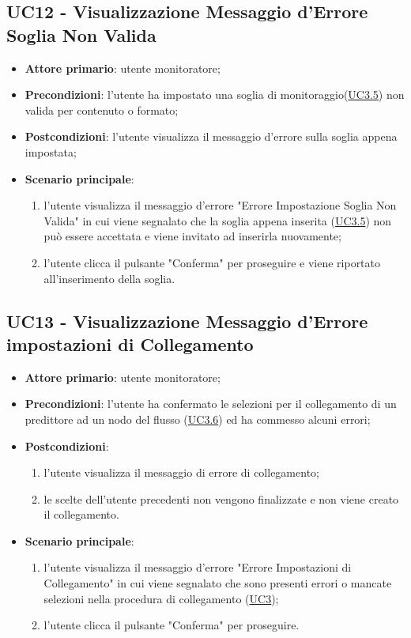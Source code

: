 
		\label{par:UC12}
	\subsection{UC12 - Visualizzazione Messaggio d'Errore Soglia Non Valida}
		\begin{itemize}
			\item\textbf{Attore primario}: utente monitoratore;
			\item\textbf{Precondizioni}: l’utente ha impostato una soglia di monitoraggio(\hyperref[par:UC3.5]{UC3.5}) non valida per contenuto o formato;
			\item\textbf{Postcondizioni}: l’utente visualizza il messaggio d'errore sulla soglia appena impostata;		
			\item\textbf{Scenario principale}:
				\begin{enumerate}
					\item l’utente visualizza il messaggio d'errore "Errore Impostazione Soglia Non Valida" in cui viene segnalato che la soglia appena inserita (\hyperref[par:UC3.5]{UC3.5}) non può essere accettata e viene invitato ad inserirla nuovamente;
					\item l'utente clicca il pulsante "Conferma" per proseguire e viene riportato all'inserimento della soglia.		
				\end{enumerate}		
		\end{itemize}


	\label{par:UC13}
	\subsection{UC13 - Visualizzazione Messaggio d'Errore impostazioni di Collegamento}
		\begin{itemize}
			\item\textbf{Attore primario}: utente monitoratore;
			\item\textbf{Precondizioni}: l’utente ha confermato le selezioni per il collegamento di un predittore ad un nodo del flusso (\hyperref[par:UC3.6]{UC3.6}) ed ha commesso alcuni errori;
			\item\textbf{Postcondizioni}:
				\begin{enumerate}
					\item l’utente visualizza il messaggio di errore di collegamento;
					\item le scelte dell'utente precedenti non vengono finalizzate e non viene creato il collegamento.
				\end{enumerate}		
			\item\textbf{Scenario principale}:
				\begin{enumerate}
					\item l’utente visualizza il messaggio d'errore "Errore Impostazioni di Collegamento" in cui viene segnalato che sono presenti errori o mancate selezioni nella procedura di collegamento (\hyperref[par:UC3]{UC3});
					\item l'utente clicca il pulsante "Conferma" per proseguire.		
				\end{enumerate}		
		\end{itemize}

